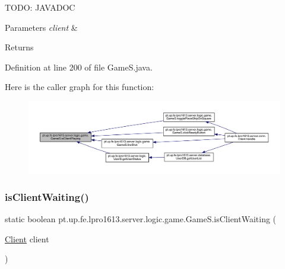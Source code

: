 T\+O\+DO\+: J\+A\+V\+A\+D\+OC 
\begin{DoxyParams}{Parameters}
{\em client} & \\
\hline
\end{DoxyParams}
\begin{DoxyReturn}{Returns}

\end{DoxyReturn}


Definition at line 200 of file Game\+S.\+java.

Here is the caller graph for this function\+:
\nopagebreak
\begin{figure}[H]
\begin{center}
\leavevmode
\includegraphics[width=350pt]{classpt_1_1up_1_1fe_1_1lpro1613_1_1server_1_1logic_1_1game_1_1_game_s_a9da22a4fd6609b821502380c3ececb41_icgraph}
\end{center}
\end{figure}
\hypertarget{classpt_1_1up_1_1fe_1_1lpro1613_1_1server_1_1logic_1_1game_1_1_game_s_a31685e0c50b5cda9628aab4467ef564f}{}\label{classpt_1_1up_1_1fe_1_1lpro1613_1_1server_1_1logic_1_1game_1_1_game_s_a31685e0c50b5cda9628aab4467ef564f} 
\subsubsection{\texorpdfstring{is\+Client\+Waiting()}{isClientWaiting()}}
{\footnotesize\ttfamily static boolean pt.\+up.\+fe.\+lpro1613.\+server.\+logic.\+game.\+Game\+S.\+is\+Client\+Waiting (\begin{DoxyParamCaption}\item[{\hyperlink{classpt_1_1up_1_1fe_1_1lpro1613_1_1server_1_1conn_1_1_client}{Client}}]{client }\end{DoxyParamCaption})\hspace{0.3cm}{\ttfamily [static]}}

